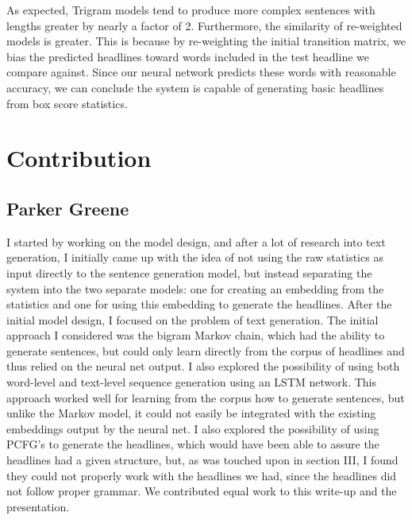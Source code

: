 \documentclass[12pt, journal]{IEEEtran}
\begin{document}
As expected, Trigram models tend to produce more complex sentences with lengths greater by nearly a factor of 2. Furthermore, the similarity of re-weighted models is greater. This is because by re-weighting the initial transition matrix, we bias the predicted headlines toward words included in the test headline we compare against. Since our neural network predicts these words with reasonable accuracy, we can conclude the system is capable of generating basic headlines from box score statistics.

\section{Contribution}

\subsection{Parker Greene}

I started by working on the model design, and after a lot of research into text generation, I initially came up with the idea of not using the raw statistics as input directly to the sentence generation model, but instead separating the system into the two separate models: one for creating an embedding from the statistics and one for using this embedding to generate the headlines. After the initial model design, I focused on the problem of text generation. The initial approach I considered was the bigram Markov chain, which had the ability to generate sentences, but could only learn directly from the corpus of headlines and thus relied on the neural net output. I also explored the possibility of using both word-level and text-level sequence generation using an LSTM network. This approach worked well for learning from the corpus how to generate sentences, but unlike the Markov model, it could not easily be integrated with the existing embeddings output by the neural net. I also explored the possibility of using PCFG's to generate the headlines, which would have been able to assure the headlines had a given structure, but, as was touched upon in section III, I found they could not properly work with the headlines we had, since the headlines did not follow proper grammar. We contributed equal work to this write-up and the presentation.
\end{document}
